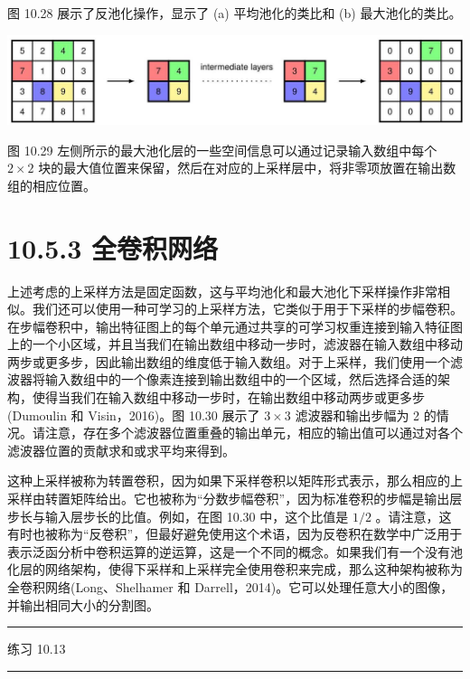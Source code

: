 \documentclass[10pt]{report}
\newcommand{\HRule}{\begin{center}\rule{0.9\linewidth}{0.2mm}\end{center}}
\begin{document}
图 10.28 展示了反池化操作，显示了 (a) 平均池化的类比和 (b) 最大池化的类比。

\begin{center}
\includegraphics[max width=1.0\textwidth]{images/0194e279-9b28-703a-88f4-c3ac21e2010d_337_177_343_1435_284_0.jpg}
\end{center}
\hspace*{3em} 

图 10.29 左侧所示的最大池化层的一些空间信息可以通过记录输入数组中每个 \(2 \times  2\) 块的最大值位置来保留，然后在对应的上采样层中，将非零项放置在输出数组的相应位置。

\section*{10.5.3 全卷积网络}

上述考虑的上采样方法是固定函数，这与平均池化和最大池化下采样操作非常相似。我们还可以使用一种可学习的上采样方法，它类似于用于下采样的步幅卷积。在步幅卷积中，输出特征图上的每个单元通过共享的可学习权重连接到输入特征图上的一个小区域，并且当我们在输出数组中移动一步时，滤波器在输入数组中移动两步或更多步，因此输出数组的维度低于输入数组。对于上采样，我们使用一个滤波器将输入数组中的一个像素连接到输出数组中的一个区域，然后选择合适的架构，使得当我们在输入数组中移动一步时，在输出数组中移动两步或更多步(Dumoulin 和 Visin，2016)。图 10.30 展示了 \(3 \times  3\) 滤波器和输出步幅为 2 的情况。请注意，存在多个滤波器位置重叠的输出单元，相应的输出值可以通过对各个滤波器位置的贡献求和或求平均来得到。

这种上采样被称为转置卷积，因为如果下采样卷积以矩阵形式表示，那么相应的上采样由转置矩阵给出。它也被称为“分数步幅卷积”，因为标准卷积的步幅是输出层步长与输入层步长的比值。例如，在图 10.30 中，这个比值是 \(1/2\) 。请注意，这有时也被称为“反卷积”，但最好避免使用这个术语，因为反卷积在数学中广泛用于表示泛函分析中卷积运算的逆运算，这是一个不同的概念。如果我们有一个没有池化层的网络架构，使得下采样和上采样完全使用卷积来完成，那么这种架构被称为全卷积网络(Long、Shelhamer 和 Darrell，2014)。它可以处理任意大小的图像，并输出相同大小的分割图。

\HRule

练习 10.13

\HRule
\end{document}
